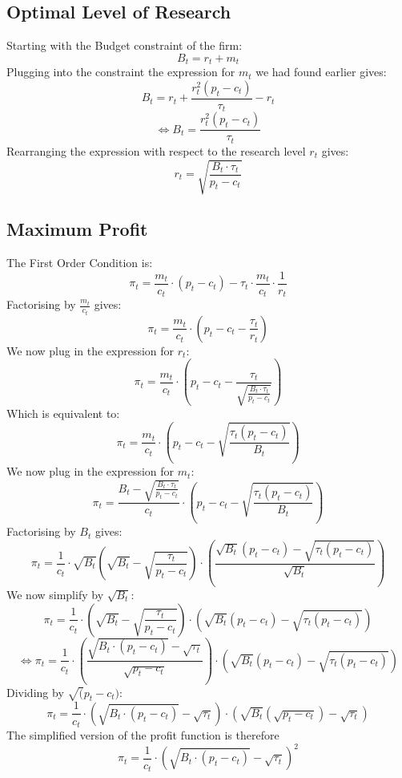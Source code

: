 \documentclass{article}
\begin{document}
\subsection{Optimal Level of Research}
\label{sec:proof4}
Starting with the Budget constraint of the firm:
$$B_{t}=r_{t}+m_{t}$$
Plugging into the constraint the expression for $m_{t}$ we had found earlier gives:
$$B_{t}=r_{t}+\frac{r_{t}^{2}\left(p_{t}-c_{t}\right)}{\tau_{t}}-r_{t}$$
$$\Leftrightarrow{B_{t}=\frac{r_{t}^{2}\left(p_{t}-c_{t}\right)}{\tau_{t}}}$$
Rearranging the expression with respect to the research level ${r_{t}}$ gives:
\begin{equation}\tag{6}
    r_{t}=\sqrt{\frac{B_{t}\cdot \tau_{t}}{p_{t}-c_{t}}}
\end{equation}

\subsection{Maximum Profit}
\label{sec:proof5}

The First Order Condition is:
$$\pi_{t}= \frac{m_{t}}{c_{t}}\cdot\left(p_{t}-c_{t}\right)-\tau_{t}\cdot \frac{m_{t}}{c_{t}}\cdot \frac{1}{r_{t}}$$
Factorising by $\frac{m_{t}}{c_{t}}$ gives:
$$\pi_{t}=\frac{m_{t}}{c_{t}}\cdot\left(p_{t}-c_{t}-\frac{\tau_{t}}{r_{t}}\right)$$
We now plug in the expression for $r_{t}$:
$$\pi_{t}=\frac{m_{t}}{c_{t}}\cdot\left(p_{t}-c_{t}-\frac{\tau_{t}}{\sqrt{\frac{B_{t}\cdot \tau_{t}}{p_{t}-c_{t}}}}\right)$$
Which is equivalent to:
$$\pi_{t}=\frac{m_{t}}{c_{t}}\cdot\left(p_{t}-c_{t}-\sqrt{\frac{\tau_{t}(p_{t}-c_{t})}{B_{t}}}\right)$$
We now plug in the expression for $m_{t}$:
$$\pi_{t}=\frac{B_{t}-\sqrt{\frac{B_{t}\cdot \tau_{t}}{p_{t}-c_{t}}}}{c_{t}}\cdot\left(p_{t}-c_{t}-\sqrt{\frac{\tau_{t}(p_{t}-c_{t})}{B_{t}}}\right)$$
Factorising by $B_{t}$ gives:
$$\pi_{t}=\frac{1}{c_{t}}\cdot\sqrt{B_{t}}\left(\sqrt{B_{t}}-\sqrt{\frac{\tau_{t}}{p_{t}-c_{t}}}\right)\cdot\left(\frac{\sqrt{B_{t}}(p_{t}-c_{t})-\sqrt{\tau_{t}(p_{t}-c_{t})}}{\sqrt{B_{t}}}\right)$$
We now simplify by $\sqrt{B_{t}}$:
$$\pi_{t}=\frac{1}{c_{t}}\cdot\left(\sqrt{B_{t}}-\sqrt{\frac{\tau_{t}}{p_{t}-c_{t}}}\right)\cdot\left(\sqrt{B_{t}}(p_{t}-c_{t})-\sqrt{\tau_{t}(p_{t}-c_{t})}\right)$$
$$\Leftrightarrow\pi_{t}=\frac{1}{c_{t}}\cdot\left(\frac{\sqrt{B_{t}\cdot (p_{t}-c_{t})}-\sqrt{\tau_{t}}}{\sqrt{p_{t}-c_{t}}}\right)\cdot\left(\sqrt{B_{t}}(p_{t}-c_{t})-\sqrt{\tau_{t}(p_{t}-c_{t})}\right)$$
Dividing by $\sqrt(p_{t}-c_{t})$:
$$\pi_{t}=\frac{1}{c_{t}}\cdot\left({\sqrt{B_{t}\cdot (p_{t}-c_{t})}-\sqrt{\tau_{t}}}\right)\cdot\left(\sqrt{B_{t}}(\sqrt{p_{t}-c_{t}})-\sqrt{\tau_{t}}\right)$$
The simplified version of the profit function is therefore
\begin{equation}\tag{7}
    \pi_{t}=\frac{1}{c_{t}}\cdot\left({\sqrt{B_{t}\cdot (p_{t}-c_{t})}-\sqrt{\tau_{t}}}\right)^{2}
\end{equation}
\end{document}

